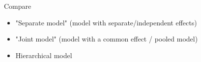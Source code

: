 \documentclass[finnish,english,t]{beamer}
\begin{document}
\begin{frame}{Compare}
  \vspace{-0.5\baselineskip}
	\begin{itemize}
    \item<+-> "Separate model" (model with separate/independent effects)
        \begin{xy}
        \end{xy}
     \item<+-> "Joint model" (model with a common effect / pooled model)
        \begin{xy}
                  \end{xy}
      \item<+-> Hierarchical model\\
        \vspace{-.5\baselineskip}\hspace{0cm}
        \begin{xy}
        \end{xy}
  \end{itemize}

\end{frame}
\end{document}
